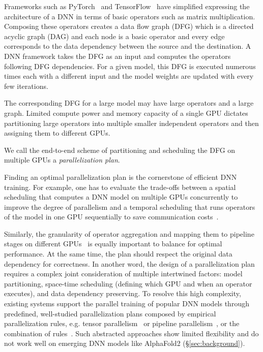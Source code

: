 Frameworks such as PyTorch~\cite{PyTorch} and TensorFlow~\cite{tensorflow} have  simplified expressing the architecture of a DNN in terms of basic operators such as matrix multiplication. Composing these operators creates a data flow graph (DFG) which is a directed acyclic graph (DAG) and each node is a basic operator and every edge corresponds to the data dependency between the source and the destination. A DNN framework takes the DFG as an input and computes the operators following DFG dependencies. For a given model, this DFG is executed numerous times each with a different input and the model weights are updated with every few iterations.

The corresponding DFG for a large model may have large operators and a large graph. Limited compute power and memory capacity of a single GPU dictates partitioning large operators into multiple smaller independent operators and then assigning them to different GPUs.

We  call the end-to-end scheme of partitioning and scheduling the DFG on multiple GPUs a {\em parallelization plan}.

Finding an optimal parallelization plan is the cornerstone of efficient DNN training. For example, one has to evaluate the trade-offs between a spatial scheduling that computes a DNN model on multiple GPUs concurrently to improve the degree of parallelism and a temporal scheduling that runs operators of the model in one GPU sequentially to save communication costs~\cite{flexflow, tofu}. 

Similarly, the granularity of operator aggregation and mapping them to pipeline stages on different GPUs~\cite{gpipe, terapipe} is equally important to balance for optimal performance. At the same time, the plan should respect the original data dependency for correctness. In another word, the design of a parallelization plan requires a complex joint consideration of multiple intertwined factors: model partitioning, space-time scheduling (defining which GPU and when an operator executes), and data dependency preserving. To resolve this high complexity, existing systems support the parallel training of popular DNN models through predefined, well-studied parallelization plans composed by empirical parallelization rules, e.g. tensor parallelism~\cite{megatron1, flexflow} or pipeline parallelism~\cite{dapple, gpipe}, or the combination of rules~\cite{megatron2, alpa, piper}. Such abstracted approaches show limited flexibility and do not work well on emerging DNN models like AlphaFold2 (\S\ref{sec:background}).

